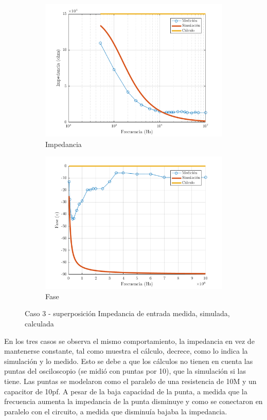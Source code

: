 \documentclass[../../main.tex]{subfiles}
\begin{document}
\begin{figure}[H]
\centering
\begin{subfigure}[http]{0.49\textwidth}
\includegraphics[width=\textwidth]{imagenes/z_n_r_c3.png}
\caption{Impedancia}\label{fig=znZc3}
\end{subfigure}
\begin{subfigure}[http]{0.49\textwidth}
\includegraphics[width=\textwidth]{imagenes/z_n_f_c3.png}
\caption{Fase} \label{fig=znFc3}
\end{subfigure}
\caption{Caso 3 - superposición Impedancia de entrada  medida, simulada, calculada}
\end{figure}

En los tres casos se observa el mismo comportamiento, la impedancia en vez de mantenerse constante, tal como muestra el cálculo, decrece, como lo indica la simulación y lo medido. Esto se debe a que los cálculos no tienen en cuenta las puntas del osciloscopio (se midió con puntas por 10), que la simulación si las tiene. Las puntas se modelaron como el paralelo de una resistencia de 10M y un capacitor de 10pf. A pesar de la baja capacidad de la punta, a medida que la frecuencia aumenta la impedancia de la punta disminuye y como se conectaron en paralelo con el circuito, a medida que disminuía bajaba la impedancia.
\end{document}
